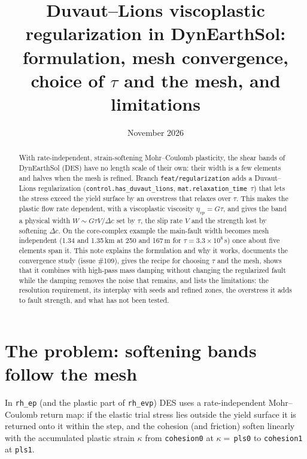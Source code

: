 \documentclass[11pt]{article}
\title{Duvaut--Lions viscoplastic regularization in DynEarthSol:\\
formulation, mesh convergence, choice of $\tau$ and the mesh, and limitations}
\author{}
\date{November 2026}
\newcommand{\code}[1]{\texttt{#1}}
\begin{document}
\maketitle

\begin{abstract}
With rate-independent, strain-softening Mohr--Coulomb plasticity, the shear bands of DynEarthSol
(DES) have no length scale of their own: their width is a few elements and halves when the mesh is
refined. Branch \code{feat/regularization} adds a Duvaut--Lions regularization
(\code{control.has\_duvaut\_lions}, \code{mat.relaxation\_time}~$\tau$) that lets the stress exceed
the yield surface by an overstress that relaxes over $\tau$. This makes the plastic flow rate
dependent, with a viscoplastic viscosity $\eta_{vp}=G\tau$, and gives the band a physical width
$W\sim G\tau V/\Delta c$ set by $\tau$, the slip rate $V$ and the strength lost by softening
$\Delta c$. On the core-complex example the main-fault width becomes mesh independent
(1.34 and 1.35\,km at 250 and 167\,m for $\tau=3.3\times10^8$\,s) once about five elements span it.
This note explains the formulation and why it works, documents the convergence study (issue \#109),
gives the recipe for choosing $\tau$ and the mesh, shows that it combines with high-pass mass damping
without changing the regularized fault while the damping removes the noise that remains, and lists
the limitations: the resolution
requirement, its interplay with seeds and refined zones, the overstress it adds to fault strength,
and what has not been tested.
\end{abstract}

\tableofcontents

\section{The problem: softening bands follow the mesh}
\label{sec:problem}

In \code{rh\_ep} (and the plastic part of \code{rh\_evp}) DES uses a rate-independent
Mohr--Coulomb return map: if the elastic trial stress lies outside the yield surface it is returned
onto it within the step, and the cohesion (and friction) soften linearly with the accumulated
plastic strain $\kappa$ from \code{cohesion0} at $\kappa=$\,\code{pls0} to \code{cohesion1} at
\code{pls1}.
\end{document}
